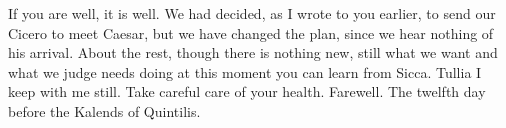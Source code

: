 

If you are well, it is well. We had decided, as I wrote to you earlier, to send our Cicero to meet Caesar, but we have changed the plan, since we hear nothing of his arrival. About the rest, though there is nothing new, still what we want and what we judge needs doing at this moment you can learn from Sicca. Tullia I keep with me still. Take careful care of your health. Farewell. The twelfth day before the Kalends of Quintilis.
